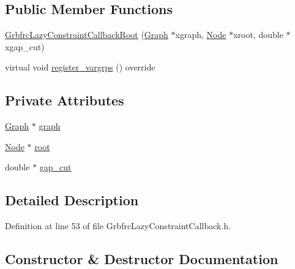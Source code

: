 \subsection*{Public Member Functions}
\begin{DoxyCompactItemize}
\item 
\hyperlink{classderegnet_1_1GrbfrcLazyConstraintCallbackRoot_a56a7b25e09c0db1de37f46d5be41009d}{Grbfrc\+Lazy\+Constraint\+Callback\+Root} (\hyperlink{namespacederegnet_a55b76c55bbabc682cbc61f8b9948799e}{Graph} $\ast$xgraph, \hyperlink{namespacederegnet_a744bad34f2de9856d36715a445f027f3}{Node} $\ast$xroot, double $\ast$xgap\+\_\+cut)
\item 
virtual void \hyperlink{classderegnet_1_1GrbfrcLazyConstraintCallbackRoot_a257a89c84c5cf68ee764cc819f3a2653}{register\+\_\+vargrps} () override
\end{DoxyCompactItemize}
\subsection*{Private Attributes}
\begin{DoxyCompactItemize}
\item 
\hyperlink{namespacederegnet_a55b76c55bbabc682cbc61f8b9948799e}{Graph} $\ast$ \hyperlink{classderegnet_1_1GrbfrcLazyConstraintCallbackRoot_a93e8aeef7796880ba2efa59770ed98ad}{graph}
\item 
\hyperlink{namespacederegnet_a744bad34f2de9856d36715a445f027f3}{Node} $\ast$ \hyperlink{classderegnet_1_1GrbfrcLazyConstraintCallbackRoot_a49a59d875ea23a1b443ec39b3c221e4d}{root}
\item 
double $\ast$ \hyperlink{classderegnet_1_1GrbfrcLazyConstraintCallbackRoot_aa396c45cfdd6231f7c93560f5ce3f013}{gap\+\_\+cut}
\end{DoxyCompactItemize}


\subsection{Detailed Description}


Definition at line 53 of file Grbfrc\+Lazy\+Constraint\+Callback.\+h.



\subsection{Constructor \& Destructor Documentation}
